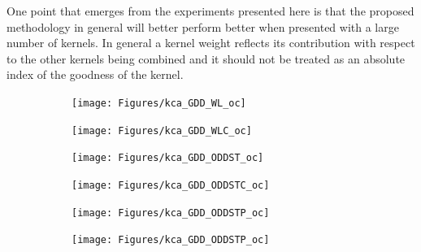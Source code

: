 
One point that emerges from the experiments presented here is that the proposed
methodology in general will better perform better when presented with a large number of kernels.
In general a kernel weight reflects its contribution with respect to the
other kernels being combined and it should not be treated as an absolute index
of the goodness of the kernel.

\begin{figure}[ht]
    \centering
    \begin{subfigure}{.45\textwidth}
        \centering
        \texttt{[image: Figures/kca\_GDD\_WL\_oc]}
        \label{fig:gdd_wloc}
        \caption{}
    \end{subfigure}
    \begin{subfigure}{.45\textwidth}
        \centering
        \texttt{[image: Figures/kca\_GDD\_WLC\_oc]}
        \label{fig:gdd_wlcoc}
        \caption{}
    \end{subfigure}
    \caption{}
    \label{fig:kca_gdd_wl}
\end{figure}

\begin{figure}[ht]
    \centering
    \begin{subfigure}{.45\textwidth}
        \centering
        \texttt{[image: Figures/kca\_GDD\_ODDST\_oc]}
        \label{fig:gdd_wloc}
        \caption{}
    \end{subfigure}
    \begin{subfigure}{.45\textwidth}
        \centering
        \texttt{[image: Figures/kca\_GDD\_ODDSTC\_oc]}
        \label{fig:gdd_wlcoc}
        \caption{}
    \end{subfigure}
    \caption{}
    \label{fig:kca_gdd_wl}
\end{figure}
\begin{figure}[ht]
    \centering
    \begin{subfigure}{.45\textwidth}
        \centering
        \texttt{[image: Figures/kca\_GDD\_ODDSTP\_oc]}
        \label{fig:gdd_wloc}
        \caption{}
    \end{subfigure}
    \begin{subfigure}{.45\textwidth}
        \centering
        \texttt{[image: Figures/kca\_GDD\_ODDSTP\_oc]}
        \label{fig:gdd_wlcoc}
        \caption{}
    \end{subfigure}
    \caption{}
    \label{fig:kca_gdd_wl}
\end{figure}


